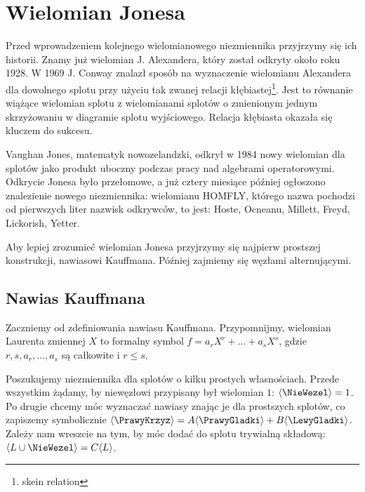 \newpage

\section{Wielomian Jonesa}

Przed wprowadzeniem kolejnego wielomianowego niezmiennika przyjrzymy się ich historii.
Znamy już wielomian J. Alexandera, który został odkryty około roku 1928.
W 1969 J. Conway znalazł sposób na wyznaczenie wielomianu Alexandera dla dowolnego splotu przy użyciu tak zwanej relacji kłębiastej\footnote{skein relation}.
Jest to równanie wiążące wielomian splotu z wielomianami splotów o zmienionym jednym skrzyżowaniu w diagramie splotu wyjściowego.
Relacja kłębiasta okazała się kluczem do sukcesu.

Vaughan Jones, matematyk nowozelandzki, odkrył w 1984 nowy wielomian dla splotów jako produkt uboczny podczas pracy nad algebrami operatorowymi.
Odkrycie Jonesa było przełomowe, a już cztery miesiące później ogłoszono znalezienie nowego niezmiennika: wielomianu HOMFLY, którego nazwa pochodzi od pierwszych liter nazwisk odkrywców, to jest: Hoste, Ocneanu, Millett, Freyd, Lickorish, Yetter.

Aby lepiej zrozumieć wielomian Jonesa przyjrzymy się najpierw prostszej konstrukcji, nawiasowi Kauffmana.
Później zajmiemy się węzłami alternującymi.

\subsection{Nawias Kauffmana}
Zaczniemy od zdefiniowania nawiasu Kauffmana.
Przypomnijmy, wielomian Laurenta zmiennej $X$ to formalny symbol $f=a_r X^r + \ldots + a_s X^s$, gdzie $r, s, a_r, \ldots, a_s$ są całkowite i $r \le s$.

Poszukujemy niezmiennika dla splotów o kilku prostych własnościach.
Przede wszystkim żądamy, by niewęzłowi przypisany był wielomian $1$: $\langle \NieWezel \rangle = 1$.
Po drugie chcemy móc wyznaczać nawiasy znając je dla prostszych splotów, co zapiszemy symbolicznie $\langle \PrawyKrzyz \rangle = A \langle \PrawyGladki \rangle + B \langle \LewyGladki \rangle$.
Zależy nam wreszcie na tym, by móc dodać do splotu trywialną składową: $\langle L \cup \NieWezel \rangle = C \langle L \rangle$.

